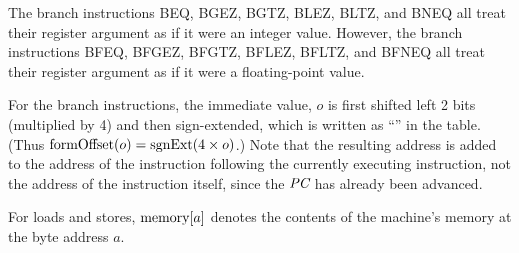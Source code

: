 \documentclass[11pt,letterpaper]{article}
\begin{document}
The branch instructions BEQ, BGEZ, BGTZ, BLEZ, BLTZ, and BNEQ all
treat their register argument as if it were an integer value.
However, the branch instructions BFEQ, BFGEZ, BFGTZ, BFLEZ, BFLTZ, and
BFNEQ all treat their register argument as if it were a floating-point value.

For the branch instructions, the immediate value, $o$ is first shifted left 2
bits (multiplied by 4) and then sign-extended, which is written as
``{\FORMOFFSETNAME}'' in the table.
(Thus $\textrm{formOffset}(o) = \textrm{sgnExt}(4 \times o)$.)
Note that the resulting address is added to the address of the
instruction following the currently executing instruction, not the
address of the instruction itself, since the $\textit{PC}$ has already been advanced.

For loads and stores, $\textrm{memory}[a]$ denotes the contents of the
machine's memory at the byte address $a$.
\end{document}

